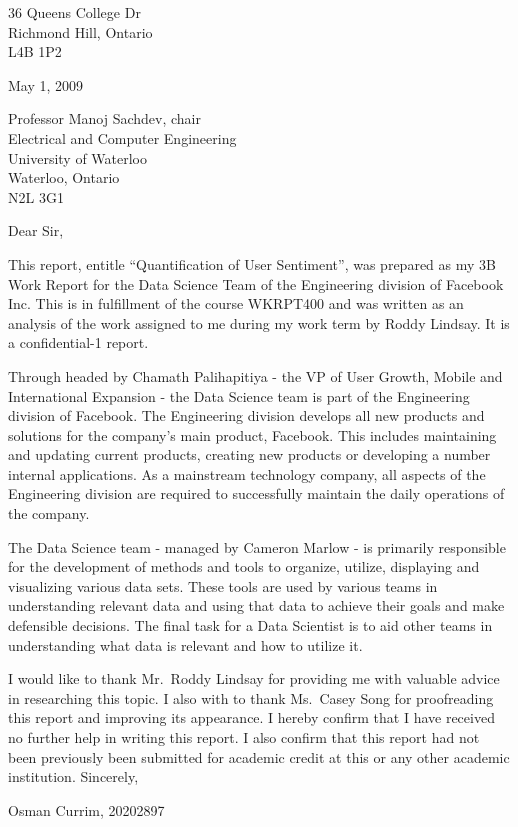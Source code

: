 \begin{titlepage} \raggedright
36 Queens College Dr\\
Richmond Hill, Ontario\\
L4B 1P2\newline

May 1, 2009\newline

Professor Manoj Sachdev, chair\\
Electrical and Computer Engineering\\
University of Waterloo\\
Waterloo, Ontario\\
N2L 3G1\newline

Dear Sir,\newline

This report, entitle ``Quantification of User Sentiment'', was prepared as my 3B Work Report for the Data Science Team of the Engineering division of Facebook Inc. This is in fulfillment of the course WKRPT400 and was written as an analysis of the work assigned to me during my work term by Roddy Lindsay. It is a confidential-1 report.\newline

Through headed by Chamath Palihapitiya - the VP of User Growth, Mobile and International Expansion - the Data Science team is part of the Engineering division of Facebook.  The Engineering division develops all new products and solutions for the company's main product, Facebook. This includes maintaining and updating current products, creating new products or developing a number internal applications. As a mainstream technology company, all aspects of the Engineering division are required to successfully maintain the daily operations of the company.\newline

The Data Science team - managed by Cameron Marlow - is primarily responsible for the development of methods and tools to organize, utilize, displaying and visualizing various data sets. These tools are used by various teams in understanding relevant data and using that data to achieve their goals and make defensible decisions. The final task for a Data Scientist is to aid other teams in understanding what data is relevant and how to utilize it.\newline

I would like to thank Mr.\ Roddy Lindsay for providing me with valuable advice in researching this topic.  I also with to thank Ms.\ Casey Song for proofreading this report and improving its appearance. I hereby confirm that I have received no further help in writing this report.  I also confirm that this report had not been previously been submitted for academic credit at this or any other academic institution.\newline
\vfill
Sincerely,\newline

Osman Currim, 20202897
\end{titlepage}